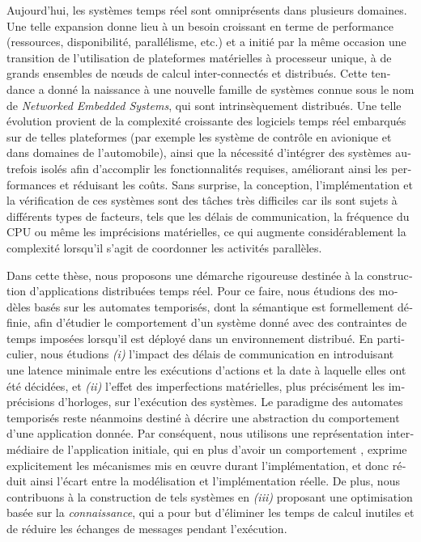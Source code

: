 \begin{abstractfr}
\begin{otherlanguage}{french}
Aujourd'hui, les systèmes temps réel sont omniprésents dans plusieurs domaines.
Une telle expansion donne lieu à un besoin croissant en terme de performance (ressources,
disponibilité, parallélisme, etc.) et a initié par la même occasion une transition de
l'utilisation de plateformes matérielles à processeur unique, à de grands ensembles
de nœuds de calcul inter-connectés et distribués. Cette tendance a donné la naissance
à une nouvelle famille de systèmes connue sous le nom de \emph{Networked Embedded Systems},
qui sont intrinsèquement distribués.
Une telle évolution provient de la complexité croissante des logiciels temps réel
embarqués sur de telles plateformes (par exemple les système de contrôle en avionique
et dans domaines de l'automobile), ainsi que la nécessité d'intégrer des systèmes autrefois 
isolés afin d'accomplir les fonctionnalités requises, améliorant ainsi les performances 
et réduisant les coûts.
Sans surprise, la conception, l'implémentation et la vérification de ces systèmes sont
des tâches très difficiles car ils sont sujets à différents types de facteurs, tels que les 
délais de communication, la fréquence du CPU ou même les imprécisions matérielles, 
ce qui augmente considérablement la complexité lorsqu'il s'agit de coordonner les activités parallèles.

Dans cette thèse, nous proposons une démarche rigoureuse destinée à la construction d'applications 
distribuées temps réel.
Pour ce faire, nous étudions des modèles basés sur les automates temporisés, dont la sémantique
est formellement définie, afin d'étudier le comportement d'un système donné avec des contraintes de temps 
imposées lorsqu'il est déployé dans un environnement distribué. En particulier, nous étudions 
\emph{(i)} l'impact des délais de communication en introduisant une latence minimale entre 
les exécutions d'actions et la date à laquelle elles ont été décidées,
et \emph{(ii)} l'effet des imperfections matérielles, plus précisément les imprécisions 
d'horloges, sur l'exécution des systèmes. 
Le paradigme des automates temporisés reste néanmoins destiné à décrire une abstraction 
du comportement d'une application donnée.
Par conséquent, nous utilisons une représentation intermédiaire de
l'application initiale, qui en plus d'avoir un comportement , exprime 
explicitement les mécanismes mis en œuvre durant l'implémentation, et donc réduit ainsi 
l'écart entre la modélisation et l'implémentation réelle.
De plus, nous contribuons à la construction de tels systèmes en \emph{(iii)}
proposant une optimisation basée sur la \emph{connaissance}, qui a pour but d'éliminer les 
temps de calcul inutiles et de réduire les échanges de messages pendant l'exécution.
  


\end{otherlanguage}
\end{abstractfr}
